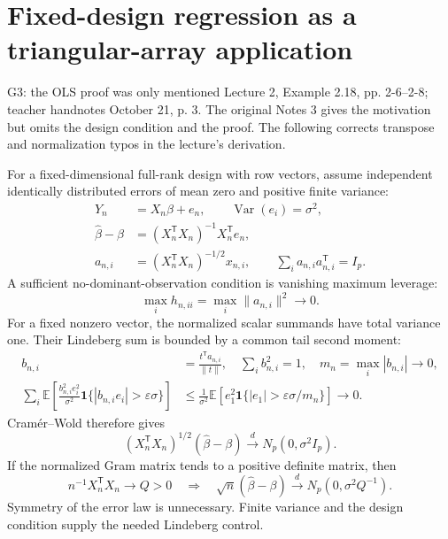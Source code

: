 \documentclass[12pt]{article}
\newcommand{\E}{\mathbb E}
\DeclareMathOperator{\Var}{Var}
\begin{document}
\section{Fixed-design regression as a triangular-array application}
\begin{gapbox}{G3: the OLS proof was only mentioned}
Lecture 2, Example 2.18, pp. 2-6--2-8; teacher handnotes October 21, p. 3.
The original Notes 3 gives the motivation but omits the design condition
and the proof. The following corrects transpose and normalization typos
in the lecture's derivation.
\end{gapbox}
For a fixed-dimensional full-rank design with row vectors, assume independent
identically distributed errors of mean zero and positive finite variance:
\begin{align}
 Y_n&=X_n\beta+e_n,\qquad\Var(e_i)=\sigma^2,\\
 \widehat\beta-\beta&=(X_n^{\mathsf T}X_n)^{-1}X_n^{\mathsf T}e_n,\\
 a_{n,i}&=(X_n^{\mathsf T}X_n)^{-1/2}x_{n,i},\qquad
 \sum_i a_{n,i}a_{n,i}^{\mathsf T}=I_p.
\end{align}
A sufficient no-dominant-observation condition is vanishing maximum leverage:
\begin{equation}
 \max_i h_{n,ii}=\max_i\|a_{n,i}\|^2\to0.
\end{equation}
For a fixed nonzero vector, the normalized scalar summands have total
variance one. Their Lindeberg sum is bounded by a common tail second moment:
\begin{align}
 b_{n,i}&=\frac{t^{\mathsf T}a_{n,i}}{\|t\|},\quad
 \sum_i b_{n,i}^2=1,\quad m_n=\max_i|b_{n,i}|\to0,\\
 \sum_i\E\left[\frac{b_{n,i}^2e_i^2}{\sigma^2}
 \mathbf1\{|b_{n,i}e_i|>\varepsilon\sigma\}\right]
 &\le\frac1{\sigma^2}\E[e_1^2\mathbf1\{|e_1|>\varepsilon\sigma/m_n\}]
 \to0.
\end{align}
Cram\'er--Wold therefore gives
\begin{equation}
 (X_n^{\mathsf T}X_n)^{1/2}(\widehat\beta-\beta)
 \xrightarrow{d}N_p(0,\sigma^2 I_p).
\end{equation}
If the normalized Gram matrix tends to a positive definite matrix, then
\begin{equation}
 n^{-1}X_n^{\mathsf T}X_n\to Q>0
 \quad\Longrightarrow\quad
 \sqrt n(\widehat\beta-\beta)\xrightarrow{d}N_p(0,\sigma^2Q^{-1}).
\end{equation}
Symmetry of the error law is unnecessary. Finite variance and the design
condition supply the needed Lindeberg control.
\end{document}
